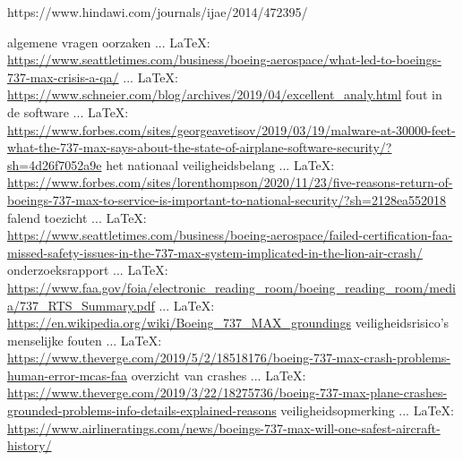 {{https://www.hindawi.com/journals/ijae/2014/472395/ 
\cite{caliskan09112013747boeingkalman}


algemene vragen
oorzaken
 ... \LaTeX:\\ \url{https://www.seattletimes.com/business/boeing-aerospace/what-led-to-boeings-737-max-crisis-a-qa/}
\cite{gates18112020boeingcrisis}
 ... \LaTeX:\\ \url{https://www.schneier.com/blog/archives/2019/04/excellent_analy.html}
\cite{boeing737maxsoftwareprobles}
fout in de software
 ... \LaTeX:\\ \url{https://www.forbes.com/sites/georgeavetisov/2019/03/19/malware-at-30000-feet-what-the-737-max-says-about-the-state-of-airplane-software-security/?sh=4d26f7052a9e}
\cite{avetisov19032019boeingmalwarestate}
het nationaal veiligheidsbelang
 ... \LaTeX:\\ \url{https://www.forbes.com/sites/lorenthompson/2020/11/23/five-reasons-return-of-boeings-737-max-to-service-is-important-to-national-security/?sh=2128ea552018}
\cite{thompson23112020nationalsecurityboeing}
falend toezicht
 ... \LaTeX:\\ \url{https://www.seattletimes.com/business/boeing-aerospace/failed-certification-faa-missed-safety-issues-in-the-737-max-system-implicated-in-the-lion-air-crash/}
\cite{gates21032019FAAControlSystem}
onderzoeksrapport
 ... \LaTeX:\\ \url{https://www.faa.gov/foia/electronic_reading_room/boeing_reading_room/media/737_RTS_Summary.pdf}
\cite{faa18112020boeingreview}
 ... \LaTeX:\\ \url{https://en.wikipedia.org/wiki/Boeing_737_MAX_groundings}
\cite{wiki737maxgroundings}
veiligheidsrisico's
menselijke fouten
 ... \LaTeX:\\ \url{https://www.theverge.com/2019/5/2/18518176/boeing-737-max-crash-problems-human-error-mcas-faa}
\cite{campbell02052019boengcrashhumanerrors}
overzicht van crashes
 ... \LaTeX:\\ \url{https://www.theverge.com/2019/3/22/18275736/boeing-737-max-plane-crashes-grounded-problems-info-details-explained-reasons}
\cite{hawkins22032019737maxairplanes}
veiligheidsopmerking
 ... \LaTeX:\\ \url{https://www.airlineratings.com/news/boeings-737-max-will-one-safest-aircraft-history/}
}}
